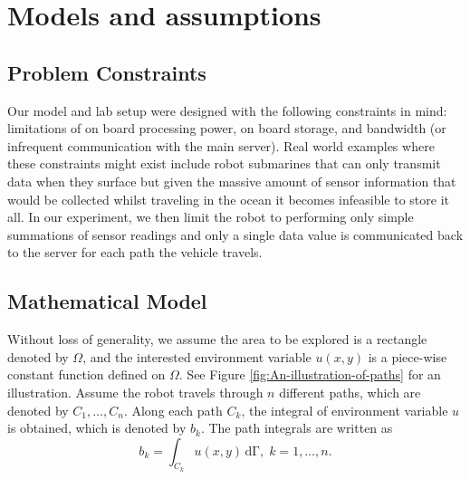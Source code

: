 \documentclass[english]{article}\usepackage[]{graphicx}\usepackage[]{color}
\begin{document}

\section{Models and assumptions}

\subsection{Problem Constraints}

Our model and lab setup were designed with the following constraints in mind: 
limitations of on board processing power, on board storage, and  bandwidth 
(or infrequent communication with the main server). Real world examples where these constraints 
might exist include robot submarines that can only transmit data when they surface but given the massive amount of sensor information that would be collected whilst traveling in the ocean it becomes infeasible to store it all. In our experiment, we then limit the robot to performing only simple summations of sensor readings and only a single data value is communicated back to the server for each path the vehicle travels.

\subsection{Mathematical Model}
Without loss of generality, we assume the area to be explored is a
rectangle denoted by $\Omega$, and the interested environment variable
$u(x,y)$ is a piece-wise constant function defined on $\Omega$.
See Figure \ref{fig:An-illustration-of-paths} for an illustration.
Assume the robot travels through $n$ different paths, which are denoted
by $C_{1},\ldots,C_{n}$. Along each path $C_{k}$, the integral of
environment variable $u$ is obtained, which is denoted by $b_{k}$.
The path integrals are written as
\begin{equation}
b_{k}=\int_{C_{k}}u(x,y)\mathrm{\,{d}\Gamma},\; k=1,\ldots,n.\label{eq:path-integral}
\end{equation}
\end{document}
